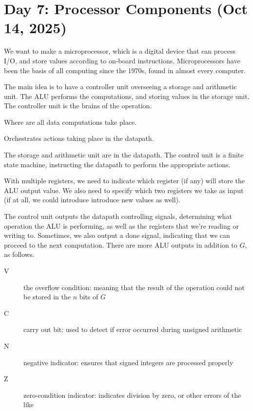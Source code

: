 \section{Day 7: Processor Components (Oct 14, 2025)}

We want to make a microprocessor, which is a digital device that can process I/O, and store values according to on-board instructions. Microprocessors have been the basis of all computing since the 1970s, found in almost every computer.

The main idea is to have a controller unit overseeing a storage and arithmetic unit. The ALU performs the computations, and storing values in the storage unit. The controller unit is the brains of the operation.

\begin{definition}[Datapath]
Where are all data computations take place.
\end{definition}

\begin{definition}
Orchestrates actions taking place in the datapath.
\end{definition}

The storage and arithmetic unit are in the datapath. The control unit is a finite state machine, instructing the datapath to perform the appropriate actions.

With multiple registers, we need to indicate which register (if any) will store the ALU output value. We also need to specify which two registers we take as input (if at all, we could introduce introduce new values as well).

The control unit outputs the datapath controlling signals, determining what operation the ALU is performing, as well as the registers that we're reading or writing to. Sometimes, we also output a done signal, indicating that we can proceed to the next computation. There are more ALU outputs in addition to $G$, as follows.
\begin{description}
    \item[V] the overflow condition: meaning that the result of the operation could not be stored in the $n$ bits of $G$ 
    \item[C] carry out bit: used to detect if error occurred during unsigned arithmetic
    \item[N] negative indicator: ensures that signed integers are processed properly
    \item[Z] zero-condition indicator: indicates division by zero, or other errors of the like
\end{description} 
